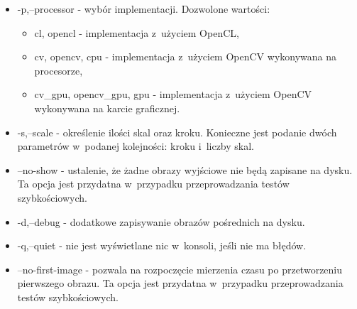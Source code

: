 \begin{itemize}
\item -p,--processor - wybór implementacji. Dozwolone wartości:
	\begin{itemize}
		\item cl, opencl - implementacja z~użyciem OpenCL,
        \item cv, opencv, cpu - implementacja z~użyciem OpenCV wykonywana na procesorze,
        \item cv\_gpu, opencv\_gpu, gpu - implementacja z~użyciem OpenCV wykonywana na karcie graficznej.
	\end{itemize}
\item -s,--scale - określenie ilości skal oraz kroku. Konieczne jest podanie dwóch parametrów w~podanej kolejności: kroku i~liczby skal.
\item --no-show - ustalenie, że żadne obrazy wyjściowe nie będą zapisane na dysku. Ta opcja jest przydatna w~przypadku przeprowadzania testów szybkościowych.
\item -d,--debug - dodatkowe zapisywanie obrazów pośrednich na dysku.
\item -q,--quiet - nie jest wyświetlane nic w~konsoli, jeśli nie ma błędów.
\item --no-first-image - pozwala na rozpoczęcie mierzenia czasu po przetworzeniu pierwszego obrazu. Ta opcja jest przydatna w~przypadku przeprowadzania testów szybkościowych.
\end{itemize}
